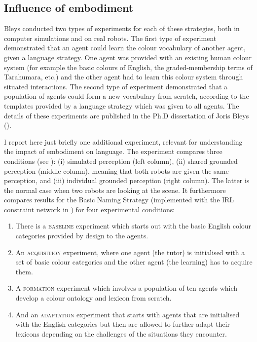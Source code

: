 \subsection{Influence of embodiment}

Bleys conducted two types of experiments for each of these strategies, both in computer simulations and on 
real robots. The first type of experiment demonstrated that an agent could learn the colour vocabulary of another agent, 
given a language strategy. One agent was provided with an existing human colour system (for example the basic colours 
of English, the graded-membership terms of Tarahumara, etc.) and the other agent had to learn this colour system through
situated interactions. The second type of experiment demonstrated that a population of agents could form a new 
vocabulary from scratch, according to the templates provided by a language strategy which was given to all agents. 
The details of these experiments are published in the Ph.D dissertation of Joris Bleys (\cite{Bleys:2014}). 

I report here just briefly one additional experiment, relevant for understanding 
the impact of embodiment on language. The experiment compares three conditions (see ): 
(i) simulated perception (left column), (ii) shared grounded perception (middle column), meaning that both robots 
are given the same perception, and (iii) individual grounded 
perception (right column). The latter is the normal case when two robots are looking at the scene. 
It furthermore compares results for the Basic Naming Strategy (implemented with the IRL constraint network in 
) for four experimental conditions: 
\begin{enumerate}
\item There is a {\scshape baseline} experiment which starts out with the basic English colour categories provided 
by design to the agents. 
\item An {\scshape acquisition} experiment, where one agent (the tutor) is initialised with a set of basic colour categories and 
the other agent (the learning) has to acquire them. 
\item A {\scshape formation} experiment which involves a population of ten agents which develop a 
colour ontology and lexicon from scratch. 
\item And an {\scshape adaptation} experiment that starts with agents that are initialised with the 
English categories but then are allowed to further adapt their lexicons depending on the challenges of the situations 
they encounter. 
\end{enumerate}

